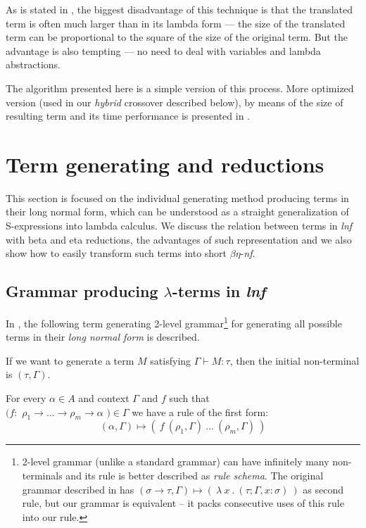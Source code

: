 \documentclass{sig-alternate}
\newcommand{\lterms}{$\lambda$-terms\xspace}
\newcommand{\tur}[3]{#1\vdash{}#2 \colon #3}
\newcommand{\benf}{$\beta\eta$-\textit{nf}\xspace}
\newcommand{\lnf}{\textit{lnf}\xspace}
\newcommand{\ar}{\rightarrow\xspace}
\newcommand{\gar}{\longmapsto}
\begin{document}
As is stated in \cite{jones87},
the biggest disadvantage of this technique is that the translated
term is often much larger than in its lambda form --- the size of
the translated term can be proportional to the square of the size 
of the original term. But the advantage is also tempting --- no need to deal with variables and lambda abstractions.

The algorithm presented here is a simple version of this process. 
More optimized version (used in our \textit{hybrid} crossover described below), by means of the size of resulting term and its time performance is presented in \cite{jones87}. 

\section{Term generating and reductions}
\label{generating}

This section is focused on the individual generating method producing
terms in their long normal form, which can be understood as a straight 
generalization of S-expressions into lambda calculus. 
We discuss the relation between terms in \lnf with beta and eta reductions,
the advantages of such representation and we also show how to easily 
transform such terms into short \benf.
   
\subsection{Grammar producing \lterms in \lnf}

In \cite{barendregt10}, the following term generating 2-level grammar\footnote{2-level grammar (unlike a standard grammar) can have infinitely many non-terminals and its rule is better described as \textit{rule schema}. The original grammar described in \cite{barendregt10} has $( \sigma \rightarrow \tau , \Gamma ) \gar (~\lambda~x~.~( \tau ; \Gamma,x:\sigma )~)$ as second rule, but our grammar is equivalent -- it packs consecutive uses of this rule into our rule.} for generating all possible
terms in their \textit{long normal form} is described.

If we want to generate a term $M$ satisfying $\tur{\Gamma}{M}{\tau}$,
then the initial non-terminal is $(\tau, \Gamma)$.

For every $\alpha \in A$ and context $\Gamma$ and $f$ such that \\
$(f :$ $\rho_1 \ar \dots \ar \rho_m \ar \alpha$ $) \in \Gamma$ 
we have a rule of the first form:
$$
( \alpha , \Gamma ) \gar 
(~f~( \rho_1 , \Gamma )~\dots~( \rho_m , \Gamma )~)
$$
\end{document}
